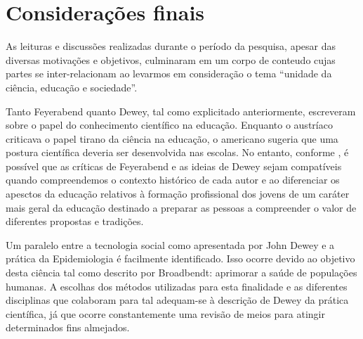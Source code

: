 \documentclass[12pt]{report}
\begin{document}
	\vspace*{-0.6cm}
	\chapter*{Considerações finais}
	\vspace*{-0.75cm}
	
	As leituras e discussões realizadas durante o período da pesquisa, apesar das diversas motivações e objetivos, culminaram em um corpo de conteudo cujas partes se inter-relacionam ao levarmos em consideração o tema ``unidade da ciência, educação e sociedade''.
	
	Tanto Feyerabend quanto Dewey, tal como explicitado anteriormente, escreveram sobre o papel do conhecimento científico na educação.
	Enquanto o austríaco criticava o papel tirano da ciência na educação, o americano sugeria que uma postura científica deveria ser desenvolvida nas escolas.
	No entanto, conforme \textcite{cunha_sci_and_edu}, é possível que as críticas de Feyerabend e as ideias de Dewey sejam compatíveis quando compreendemos o contexto histórico de cada autor e ao diferenciar os apesctos da educação relativos à formação profissional dos jovens de um caráter mais geral da educação destinado a preparar as pessoas a compreender o valor de diferentes propostas e tradições.
	
	Um paralelo entre a tecnologia social como apresentada por John Dewey e a prática da Epidemiologia é facilmente identificado.
	Isso ocorre devido ao objetivo desta ciência tal como descrito por Broadbendt: aprimorar a saúde de populações humanas.
	A escolhas dos métodos utilizadas para esta finalidade e as diferentes disciplinas que colaboram para tal adequam-se à descrição de Dewey da prática científica, já que ocorre constantemente uma revisão de meios para atingir determinados fins almejados.
	
\end{document}
